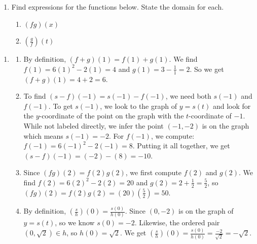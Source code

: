 \documentclass{ximera}
\begin{document}
\begin{example}
\begin{enumerate}
\begin{enumerate}
\end{enumerate}

\item \label{arithexpressionex} Find expressions for the functions below.  State the domain for each.

\begin{enumerate}

\item   \label{proddomainex} $(fg)(x)$

\item  \label{quotdomainex}  $\left(\frac{g}{f}\right)(t)$

\end{enumerate}

\end{enumerate}

\begin{explanation}

\begin{enumerate}

\item \begin{enumerate}

\item  By definition, $(f+g)(1) = f(1) + g(1)$.   We find $f(1) = 6(1)^2-2(1) = 4$ and $g(1) = 3 - \frac{1}{1} = 2$. So we get  $(f+g)(1) = 4+2 = 6$.

\item  To find $(s-f)(-1) = s(-1) - f(-1)$, we need both $s(-1)$ and $f(-1)$.  To get $s(-1)$, we look to the graph of $y = s(t)$ and look for the $y$-coordinate of the point on the graph with the $t$-coordinate of $-1$.  While not labeled directly, we infer the point $(-1,-2)$ is on the graph which means $s(-1) = -2$. For $f(-1)$, we compute: $f(-1) = 6(-1)^2-2(-1) = 8$.  Putting it all together, we get $(s-f)(-1) = (-2) -(8) = -10$.

\item Since $(fg)(2) = f(2)g(2)$, we first  compute $f(2)$ and $g(2)$. We find $f(2) = 6(2)^2-2(2) = 20$ and $g(2) = 2 + \frac{1}{2} = \frac{5}{2}$, so $(fg)(2) = f(2) g(2) = (20)\left(\frac{5}{2}\right) = 50$.

\item By definition, $\left( \frac{s}{h} \right)(0) = \frac{s(0)}{h(0)}$.  Since $(0, -2)$ is on the graph of $y=s(t)$, so we know $s(0)  = -2$.  Likewise, the ordered pair $(0, \sqrt{2}) \in h$, so $h(0) = \sqrt{2}$.  We get  $\left( \frac{s}{h} \right)(0) = \frac{s(0)}{h(0)} = \frac{-2}{\sqrt{2}} = -\sqrt{2}$.


\end{enumerate}
\end{enumerate}
\end{explanation}
\end{example}
\end{document}
